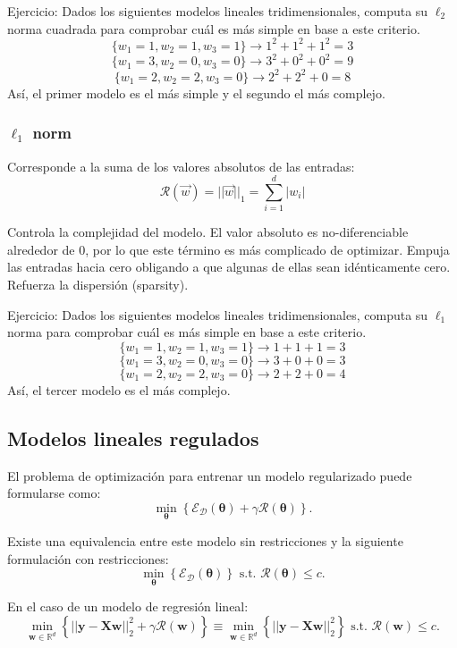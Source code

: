 Ejercicio: Dados los siguientes modelos lineales tridimensionales, computa su $\ell_2$ norma cuadrada para comprobar cuál es más simple en base a este criterio.
$$\{w_1 = 1, w_2 = 1, w_3 = 1\} \rightarrow 1^2 + 1^2 + 1^2 = 3$$
$$\{w_1 = 3, w_2 = 0, w_3 = 0\} \rightarrow 3^2 + 0^2 + 0^2 = 9$$
$$\{w_1 = 2, w_2 = 2, w_3 = 0\} \rightarrow 2^2 + 2^2 + 0 = 8 $$
Así, el primer modelo es el más simple y el segundo el más complejo.

\subsubsection{$\ell_1$ norm}
Corresponde a la suma de los valores absolutos de las entradas:
$$\mathcal{R}(\vec{w}) = ||\vec{w}||_1 = \sum^d_{i=1} |w_i|$$

Controla la complejidad del modelo. El valor absoluto es no-diferenciable alrededor de 0, por lo que este término es más complicado de optimizar.  Empuja las entradas hacia cero obligando a que algunas de ellas sean idénticamente cero. Refuerza la dispersión (sparsity).

Ejercicio: Dados los siguientes modelos lineales tridimensionales, computa su $\ell_1$ norma para comprobar cuál es más simple en base a este criterio.
$$\{w_1 = 1, w_2 = 1, w_3 = 1\} \rightarrow 1 + 1 + 1 = 3$$
$$\{w_1 = 3, w_2 = 0, w_3 = 0\} \rightarrow 3 + 0 + 0 = 3$$
$$\{w_1 = 2, w_2 = 2, w_3 = 0\} \rightarrow 2 + 2 + 0 = 4 $$
Así, el tercer modelo es el más complejo.

\subsection{Modelos lineales regulados}
El problema de optimización para entrenar un modelo regularizado puede formularse como:
$$
\min_{\boldsymbol{\theta}} \left\{\mathcal{E}_{\mathcal{D}}(\boldsymbol{\theta}) + \gamma\mathcal{R}(\boldsymbol{\theta})\right\}.
$$

Existe una equivalencia entre este modelo sin restricciones y la siguiente formulación con restricciones:
$$
\min_{\boldsymbol{\theta}} \left\{\mathcal{E}_{\mathcal{D}}(\boldsymbol{\theta})\right\} \text{ s.t. } \mathcal{R}(\boldsymbol{\theta}) \leq c.
$$

En el caso de un modelo de regresión lineal:
$$
\min_{\mathbf{w}\in\mathbb{R}^{d}} \left\{||\mathbf{y}-\mathbf{X}\mathbf{w}||_{2}^{2} + \gamma\mathcal{R}(\mathbf{w})\right\} \equiv \min_{\mathbf{w}\in\mathbb{R}^{d}} \left\{||\mathbf{y}-\mathbf{X}\mathbf{w}||_{2}^{2}\right\} \text{ s.t. } \mathcal{R}(\mathbf{w}) \leq c.
$$

